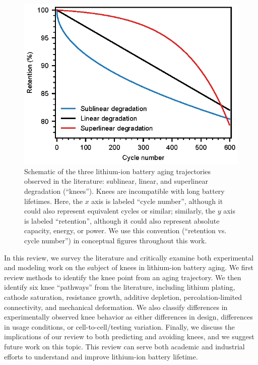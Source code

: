 \documentclass[journal=jpcl, manuscript=article, layout=onecolumn]{achemso}
\begin{document}
\begin{figure}[ht]
\centering
\includegraphics[scale=1]{figures/degradation_rates.eps}
\caption{Schematic of the three lithium-ion battery aging trajectories observed in the literature: sublinear, linear, and superlinear degradation (``knees''). Knees are incompatible with long battery lifetimes. Here, the $x$ axis is labeled ``cycle number'', although it could also represent equivalent cycles or similar; similarly, the $y$ axis is labeled ``retention'', although it could also represent absolute capacity, energy, or power. We use this convention (``retention vs. cycle number'') in conceptual figures throughout this work.}
\label{fig:degradation_shapes}
\end{figure}


In this review, we survey the literature and critically examine both experimental and modeling work on the subject of knees in lithium-ion battery aging. We first review methods to identify the knee point from an aging trajectory. We then identify six knee ``pathways'' from the literature, including lithium plating, cathode saturation, resistance growth, additive depletion, percolation-limited connectivity, and mechanical deformation. We also classify differences in experimentally observed knee behavior as either differences in design, differences in usage conditions, or cell-to-cell/testing variation. Finally, we discuss the implications of our review to both predicting and avoiding knees, and we suggest future work on this topic. This review can serve both academic and industrial efforts to understand and improve lithium-ion battery lifetime.
\end{document}
